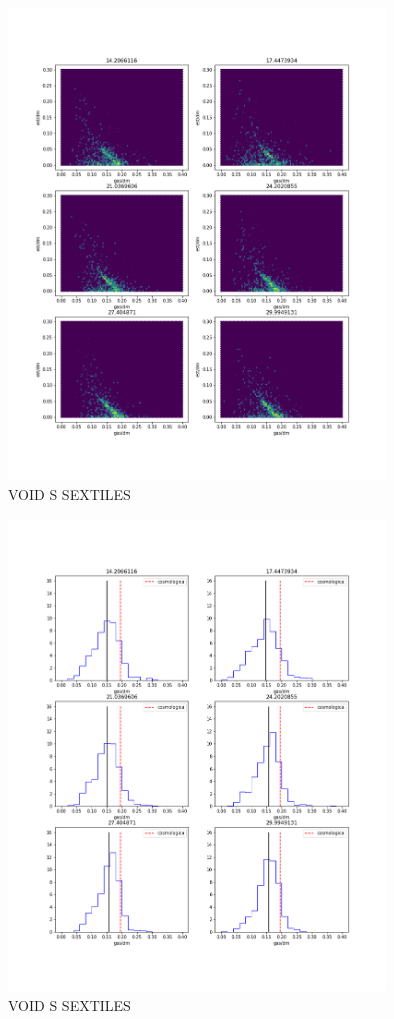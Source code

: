 \begin{figure}[h]
\centering
\includegraphics[width=10cm]{Figures/fracciones_S.png}
\decoRule
\caption[asd]{VOID S SEXTILES  }
\label{fig:Electron}
\end{figure}
\begin{figure}[h]
\centering
\includegraphics[width=10cm]{Figures/histogramas_S.png}
\decoRule
\caption[asd]{VOID S  SEXTILES}
\label{fig:Electron}
\end{figure}

